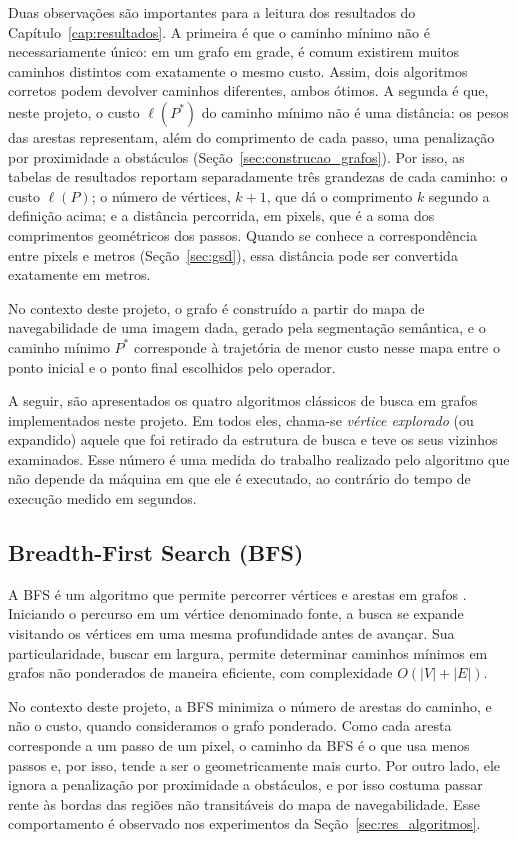 \documentclass[
    12pt,
    openright,
    oneside,
    a4paper,
    english,
    brazil
]{abntex2}
\begin{document}
Duas observações são importantes para a leitura dos resultados do Capítulo~\ref{cap:resultados}. A primeira é que o caminho mínimo não é necessariamente único: em um grafo em grade, é comum existirem muitos caminhos distintos com exatamente o mesmo custo. Assim, dois algoritmos corretos podem devolver caminhos diferentes, ambos ótimos. A segunda é que, neste projeto, o custo $\ell(P^\ast)$ do caminho mínimo não é uma distância: os pesos das arestas representam, além do comprimento de cada passo, uma penalização por proximidade a obstáculos (Seção~\ref{sec:construcao_grafos}). Por isso, as tabelas de resultados reportam separadamente três grandezas de cada caminho: o custo $\ell(P)$; o número de vértices, $k+1$, que dá o comprimento $k$ segundo a definição acima; e a distância percorrida, em pixels, que é a soma dos comprimentos geométricos dos passos. Quando se conhece a correspondência entre pixels e metros (Seção~\ref{sec:gsd}), essa distância pode ser convertida exatamente em metros.

No contexto deste projeto, o grafo é construído a partir do mapa de navegabilidade de uma imagem dada, gerado pela segmentação semântica, e o caminho mínimo $P^\ast$ corresponde à trajetória de menor custo nesse mapa entre o ponto inicial e o ponto final escolhidos pelo operador.

A seguir, são apresentados os quatro algoritmos clássicos de busca em grafos implementados neste projeto. Em todos eles, chama-se \emph{vértice explorado} (ou expandido) aquele que foi retirado da estrutura de busca e teve os seus vizinhos examinados. Esse número é uma medida do trabalho realizado pelo algoritmo que não depende da máquina em que ele é executado, ao contrário do tempo de execução medido em segundos.

\subsection{Breadth-First Search (BFS)}

A BFS é um algoritmo que permite percorrer vértices e arestas em grafos \cite{cormen2009, moore1959}. Iniciando o percurso em um vértice denominado fonte, a busca se expande visitando os vértices em uma mesma profundidade antes de avançar. Sua particularidade, buscar em largura, permite determinar caminhos mínimos em grafos não ponderados de maneira eficiente, com complexidade $O(|V| + |E|)$.

No contexto deste projeto, a BFS minimiza o número de arestas do caminho, e não o custo, quando consideramos o grafo ponderado. Como cada aresta corresponde a um passo de um pixel, o caminho da BFS é o que usa menos passos e, por isso, tende a ser o geometricamente mais curto. Por outro lado, ele ignora a penalização por proximidade a obstáculos, e por isso costuma passar rente às bordas das regiões não transitáveis do mapa de navegabilidade. Esse comportamento é observado nos experimentos da Seção~\ref{sec:res_algoritmos}.
\end{document}
